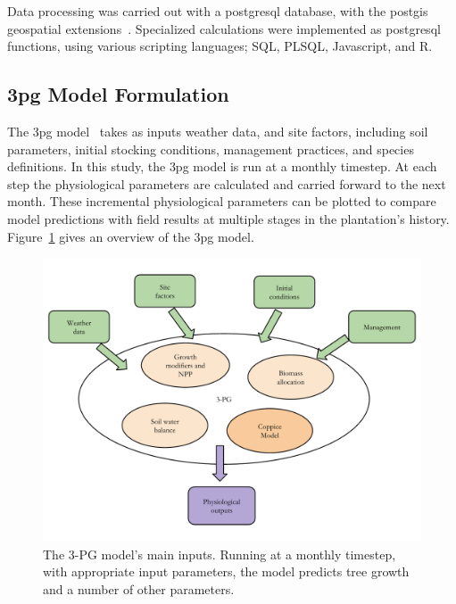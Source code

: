 \documentclass[preprint,12pt]{elsarticle}
\begin{document}
Data processing was carried out with a postgresql database, with the
postgis geospatial extensions~\cite{pgsql,Holl2009,postgis}.
Specialized calculations were implemented as postgresql functions, using
various scripting languages; SQL, PLSQL, Javascript, and R.

\subsection{\acs{3pg} Model Formulation}
\label{sec:3pg}

The \acf{3pg} model~\cite{Landsberg1997, landsberg2010physiological,
  Sands2004} takes as inputs weather data, and site factors, including
soil parameters, initial stocking conditions, management practices,
and species definitions.  In this study, the \ac{3pg} model is run at
a monthly timestep. At each step the physiological parameters are
calculated and carried forward to the next month.  These incremental
physiological parameters can be plotted to compare model predictions
with field results at multiple stages in the plantation’s history.
Figure~\ref{fig:overview} gives an overview of the \acf{3pg} model.

\begin{figure}[p]
\includegraphics[width=\linewidth]{model_overview}
\caption{ The 3-PG model’s main inputs.  Running at a monthly timestep, with
appropriate input parameters, the model predicts tree growth and a
number of other parameters.}
\label{fig:overview}
\end{figure}
\end{document}
